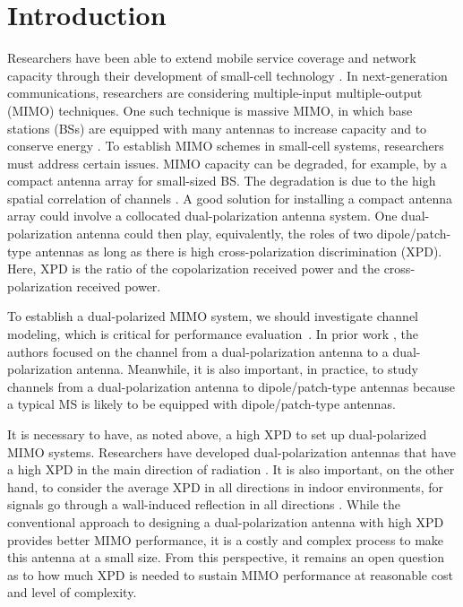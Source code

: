 \documentclass[journal]{IEEEtran}
\begin{document}
\section{Introduction}\label{Sec:Intro}
Researchers have been able to extend mobile service coverage and network capacity through their development of small-cell technology \cite{Jang_WCM16}. In next-generation communications, researchers are considering multiple-input multiple-output (MIMO) techniques\cite{Chae_SPMag_07}. One such technique is massive MIMO, in which base stations (BSs) are equipped with many antennas to increase capacity and to conserve energy \cite{Rusek_SPMag_12, Lim_TWC}. To establish MIMO schemes in small-cell systems, researchers must address certain issues. MIMO capacity can be degraded, for example, by a compact antenna array for small-sized BS. The degradation is due to the high spatial correlation of channels \cite{Rusek_SPMag_12, Lim_ICC14}. A good solution for installing a compact antenna array could involve a collocated dual-polarization antenna system. One dual-polarization antenna could then play, equivalently, the roles of two dipole/patch-type antennas as long as there is high cross-polarization discrimination (XPD). Here, XPD is the ratio of the copolarization received power and the cross-polarization received power.

To establish a dual-polarized MIMO system, we should investigate channel modeling, which is critical for performance evaluation~\cite{DP_WCM}. In prior work \cite{DPchannel, DPchannel2}, the authors focused on the channel from a dual-polarization antenna to a dual-polarization antenna. 
Meanwhile, it is also important, in practice, to study channels from a dual-polarization antenna to dipole/patch-type antennas because a typical MS is likely to be equipped with dipole/patch-type antennas. 

It is necessary to have, as noted above, a high XPD to set up dual-polarized MIMO systems. Researchers have developed dual-polarization antennas that have a high XPD in the main direction of radiation \cite{DP2, DP3}. It is also important, on the other hand, to consider the average XPD in all directions in indoor environments, for signals go through a wall-induced reflection in all directions \cite{ManufDP}. While the conventional approach to designing a dual-polarization antenna with high XPD provides better MIMO performance, it is a costly and complex process to make this antenna at a small size. From this perspective, it remains an open question as to how much XPD is needed to sustain MIMO performance at reasonable cost and level of complexity.
\end{document}

